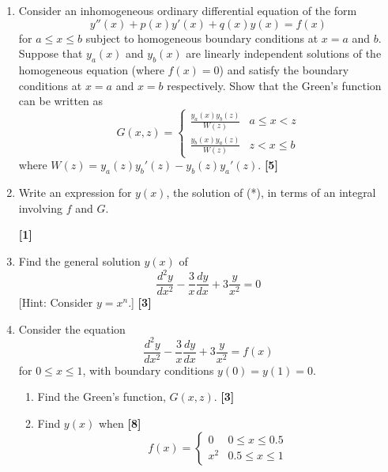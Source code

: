 \documentclass[a4paper]{article}
\begin{document}
\begin{qns}\leavevmode
\begin{enumerate}[label=(\alph*)]
\item  Consider an inhomogeneous ordinary differential equation of the form
\begin{equation}
    y''(x)+p(x)y'(x)+q(x)y(x)=f(x)\tag{*}
\end{equation}
for $a\leq x\leq b$ subject to homogeneous boundary conditions at $x = a$ and $b$. Suppose that $y_a(x)$ and $y_b(x)$ are linearly independent solutions of the homogeneous equation (where $f(x) = 0$) and satisfy the boundary conditions at $x = a$ and $x = b$ respectively. Show that the Green’s function can be written as
$$G(x,z)=
\left\{
        \begin{array}{ll}
      \frac{y_a(x)y_b(z)}{W(z)} & a\leq x< z \\
      \frac{y_b(x)y_a(z)}{W(z)} & z< x\leq b 
        \end{array}
    \right.$$
where $W(z)=y_a(z)y_b'(z)-y_b(z)y_a'(z)$. \hfill\textbf{[5]}
\item Write an expression for $y(x)$, the solution of (*), in terms of an integral involving $f$ and $G$.

\hfill\textbf{[1]}
\item  Find the general solution $y(x)$ of
$$\frac{d^2y}{dx^2}-\frac{3}{x}\frac{dy}{dx}+3\frac{y}{x^2}=0$$
[Hint: Consider $y = x^n$.] \hfill\textbf{[3]}
\item Consider the equation
$$\frac{d^2y}{dx^2}-\frac{3}{x}\frac{dy}{dx}+3\frac{y}{x^2}=f(x)$$
for $0\leq x\leq 1$, with boundary conditions $y(0) = y(1) = 0$.
\begin{enumerate}[label=(\roman*)]
\item Find the Green’s function, $G(x, z)$. \hfill\textbf{[3]}
\item Find $y(x)$ when \hfill\textbf{[8]}
$$f(x)=
\left\{
        \begin{array}{ll}
      0 & 0\leq x\leq 0.5 \\
      x^2 & 0.5\leq x\le1 
        \end{array}
    \right.$$
    \end{enumerate}
\end{enumerate}
\end{qns}
\end{document}
